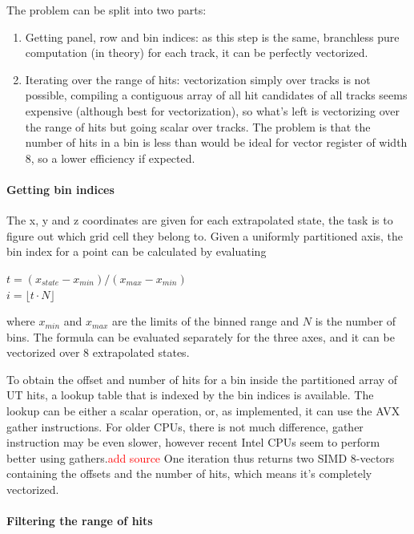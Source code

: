\documentclass[12pt]{article}
\begin{document}
The problem can be split into two parts:
\begin{enumerate}
	\item Getting panel, row and bin indices: as this step is the same, branchless pure computation (in theory) for each track, it can be perfectly vectorized.
	\item Iterating over the range of hits: vectorization simply over tracks is not possible, compiling a contiguous array of all hit candidates of all tracks seems expensive (although best for vectorization), so what's left is vectorizing over the range of hits but going scalar over tracks. The problem is that the number of hits in a bin is less than would be ideal for vector register of width 8, so a lower efficiency if expected.
\end{enumerate}


\paragraph{Getting bin indices} \mbox{}\vspace{0.4pc}

The x, y and z coordinates are given for each extrapolated state, the task is to figure out which grid cell they belong to. Given a uniformly partitioned axis, the bin index for a point can be calculated by evaluating
\begin{center}
	$t = (x_{state} - x_{min})/(x_{max} - x_{min})$\\
	$i =  \lfloor t \cdot N \rfloor$	
\end{center}
where $x_{min}$ and $x_{max}$ are the limits of the binned range and $N$ is the number of bins. The formula can be evaluated separately for the three axes, and it can be vectorized over 8 extrapolated states.

To obtain the offset and number of hits for a bin inside the partitioned array of UT hits, a lookup table that is indexed by the bin indices is available. The lookup can be either a scalar operation, or, as implemented, it can use the AVX gather instructions. For older CPUs, there is not much difference, gather instruction may be even slower, however recent Intel CPUs seem to perform better using gathers.\textcolor{red}{add source} One iteration thus returns two SIMD 8-vectors containing the offsets and the number of hits, which means it's completely vectorized.

\paragraph{Filtering the range of hits} \mbox{}\vspace{0.4pc}
\end{document}
